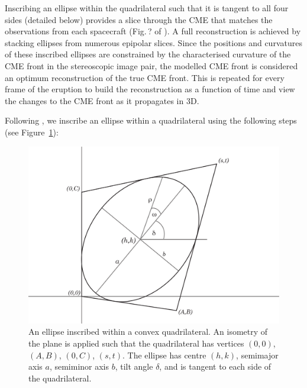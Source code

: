 \documentclass[preprint2]{aastex}
\begin{document}
Inscribing an ellipse within the quadrilateral such that it is tangent to all four sides (detailed below) provides a slice through the CME that matches the observations from each spacecraft (Fig.\,? of \citet{2010NatCo...1E..74B}). A full reconstruction is achieved by stacking ellipses from numerous epipolar slices. Since the positions and curvatures of these inscribed ellipses are constrained by the characterised curvature of the CME front in the stereoscopic image pair, the modelled CME front is considered an optimum reconstruction of the true CME front. This is repeated for every frame of the eruption to build the reconstruction as a function of time and view the changes to the CME front as it propagates in 3D.

Following \citet{2002SWJPAM..1.6H, 2005AJMAA..2.1H}, we inscribe an ellipse within a quadrilateral using the following steps (see Figure~\ref{ellipseinscribed}):

\begin{figure}[!t]
\centerline{\includegraphics[width=\linewidth, scale=0.25, clip=true, trim=150 0 200 0]{images/ellipseinscribed.pdf}}
\caption{An ellipse inscribed within a convex quadrilateral. An isometry of the plane is applied such that the quadrilateral has vertices $(0,0)$, $(A,B)$, $(0,C)$, $(s,t)$. The ellipse has centre $(h,k)$, semimajor axis $a$, semiminor axis $b$, tilt angle $\delta$, and is tangent to each side of the quadrilateral.}
\label{ellipseinscribed}
\end{figure}
\end{document}

